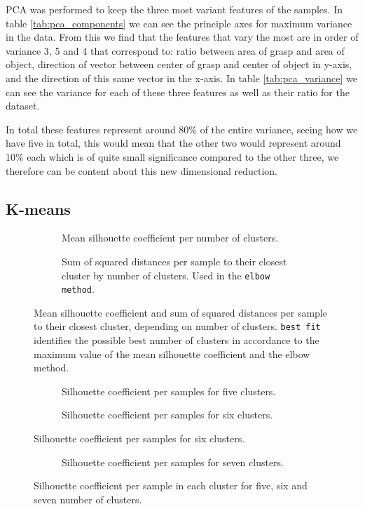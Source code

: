 PCA was performed to keep the three most variant features of the samples. In table \ref{tab:pca_components} we can see the principle axes for maximum variance in the data. From this we find that the features that vary the most are in order of variance 3, 5 and 4 that correspond to: ratio between area of grasp and area of object, direction of vector between center of grasp and center of object in y-axis, and the direction of this same vector in the x-axis. In table \ref{tab:pca_variance} we can see the variance for each of these three features as well as their ratio for the dataset.

In total these features represent around 80\% of the entire variance, seeing how we have five in total, this would mean that the other two would represent around 10\% each which is of quite small significance compared to the other three, we therefore can be content about this new dimensional reduction.


\subsection{K-means}

\begin{figure}
	\begin{subfigure}[b]{\textwidth}
		
		\caption{Mean silhouette coefficient per number of clusters.}
	\end{subfigure}
	\begin{subfigure}[b]{\textwidth}
		
		\caption{Sum of squared distances per sample to their closest cluster by number of clusters. Used in the \texttt{elbow method}.}
	\end{subfigure}
	\caption{Mean silhouette coefficient and sum of squared distances per sample to their closest cluster, depending on number of clusters. \texttt{best fit} identifies the possible best number of clusters in accordance to the maximum value of the mean silhouette coefficient and the elbow method.}
	\label{fig:kmeans_score}
\end{figure}

\begin{figure}
	\begin{subfigure}[b]{\textwidth}
		
		\caption{Silhouette coefficient per samples for five clusters.}
	\end{subfigure}
	\begin{subfigure}[b]{\textwidth}
		
		\caption{Silhouette coefficient per samples for six clusters.}
		\label{fig:silhouette_6}
	\end{subfigure}
\end{figure}
\begin{figure}
	\ContinuedFloat
	\begin{subfigure}[b]{\textwidth}
		
		\caption{Silhouette coefficient per samples for seven clusters.}
	\end{subfigure}
	\caption{Silhouette coefficient per sample in each cluster for five, six and seven number of clusters.}
	\label{fig:silhouette_coef}
\end{figure}

